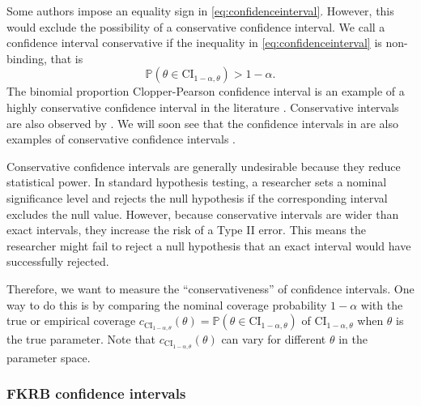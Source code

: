 Some authors impose an equality sign in \cref{eq:confidenceinterval}.
However, this would exclude the possibility of a conservative confidence interval.
We call a confidence interval conservative if the inequality in \cref{eq:confidenceinterval} is non-binding, that is
\begin{equation}
\label{eq:conservativeconfidenceinterval}
    \mathbb{P}(\theta \in \mathrm{CI}_{1-\alpha,\theta}) > 1- \alpha.
\end{equation}
The binomial proportion Clopper-Pearson confidence interval \citep{ClopperPearson1934} is an example of a highly conservative confidence interval in the literature \citep[see also][]{BrownCaiDasGupta2001}.
Conservative intervals are also observed by \citet{Garwood1936,Dunn1959,Dunn1961}.
We will soon see that the confidence intervals in  are also examples of conservative confidence intervals \citep{FoxKimRyanBajari2011}.

Conservative confidence intervals are generally undesirable because they reduce statistical power. 
In standard hypothesis testing, a researcher sets a nominal significance level and rejects the null hypothesis if the corresponding interval excludes the null value. 
However, because conservative intervals are wider than exact intervals, they increase the risk of a Type II error.
This means the researcher might fail to reject a null hypothesis that an exact interval would have successfully rejected.

Therefore, we want to measure the ``conservativeness'' of confidence intervals.
One way to do this is by comparing the nominal coverage probability $1 - \alpha$ with the true or empirical coverage $c_{\mathrm{CI}_{1-\alpha,\theta}}(\theta) = \mathbb{P}(\theta \in \mathrm{CI}_{1-\alpha,\theta})$ of $\mathrm{CI}_{1-\alpha,\theta}$ when $\theta$ is the true parameter.
Note that $c_{\mathrm{CI}_{1-\alpha,\theta}}(\theta)$ can vary for different $\theta$ in the parameter space.

\subsubsection{FKRB confidence intervals}
\label{sec:FKRBconfidence}

